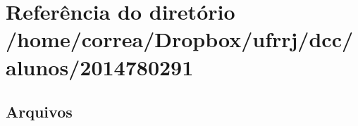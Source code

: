 \section{Referência do diretório /home/correa/\+Dropbox/ufrrj/dcc/alunos/2014780291}
\label{dir_8d2de5305f3a7606eec520f0cb4ffba3}
\subsection*{Arquivos}
\begin{DoxyCompactItemize}
\end{DoxyCompactItemize}
